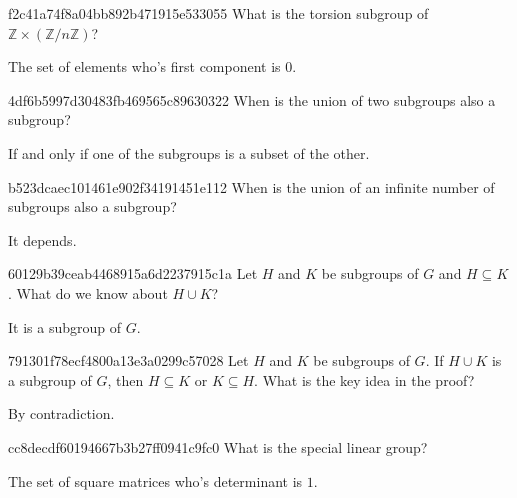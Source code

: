 \begin{note}{f2c41a74f8a04bb892b471915e533055}
    What is the torsion subgroup of \({ \mathbb Z \times (\mathbb Z / n\mathbb Z) }\)?

    \begin{cloze}{1}
        The set of elements who's first component is \({ 0 }\).
    \end{cloze}
\end{note}

\begin{note}{4df6b5997d30483fb469565c89630322}
    When is the union of two subgroups also a subgroup?

    \begin{cloze}{1}
        If and only if one of the subgroups is a subset of the other.
    \end{cloze}
\end{note}

\begin{note}{b523dcaec101461e902f34191451e112}
    When is the union of an infinite number of subgroups also a subgroup?

    \begin{cloze}{1}
        It depends.
    \end{cloze}
\end{note}

\begin{note}{60129b39ceab4468915a6d2237915c1a}
    Let \({ H }\) and \({ K }\) be subgroups of \({ G }\) and \({ H \subseteq K }\).
    What do we know about \({ H \cup K }\)?

    \begin{cloze}{1}
        It is a subgroup of \({ G }\).
    \end{cloze}
\end{note}

\begin{note}{791301f78ecf4800a13e3a0299c57028}
    Let \({ H }\) and \({ K }\) be subgroups of \({ G }\).
    If \({ H \cup K }\) is a subgroup of \({ G }\), then \({ H \subseteq K }\) or \({ K \subseteq H }\).
    What is the key idea in the proof?

    \begin{cloze}{1}
        By contradiction.
    \end{cloze}
\end{note}

\begin{note}{cc8decdf60194667b3b27ff0941c9fc0}
    What is the special linear group?

    \begin{cloze}{1}
        The set of square matrices who's determinant is \({ 1 }\).
    \end{cloze}
\end{note}

